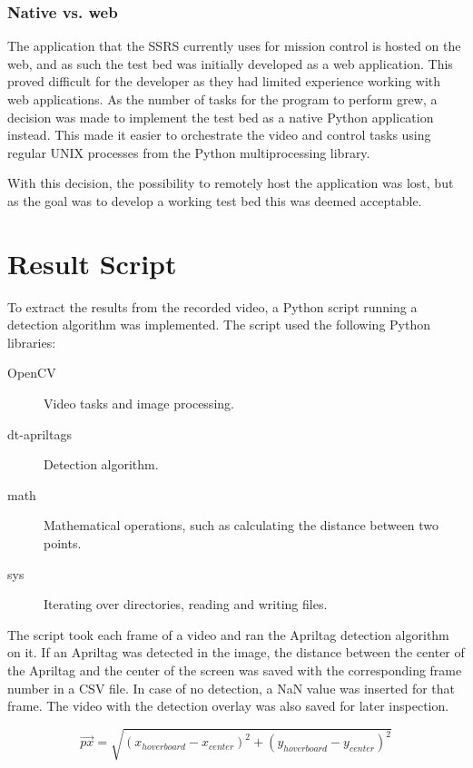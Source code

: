 \documentclass[nofilelist]{cslthse-msc}
\begin{document}
\subsubsection{Native vs. web}
The application that the SSRS currently uses for mission control is hosted on the web, and as such the test bed was initially developed as a web application. This proved difficult for the developer as they had limited experience working with web applications. As the number of tasks for the program to perform grew, a decision was made to implement the test bed as a native Python application instead. This made it easier to orchestrate the video and control tasks using regular UNIX processes from the Python multiprocessing library. 

With this decision, the possibility to remotely host the application was lost, but as the goal was to develop a working test bed this was deemed acceptable. 

\section{Result Script}
\label{sec:resultscript}
To extract the results from the recorded video, a Python script running a detection algorithm was implemented. The script used the following Python libraries:
\begin{description}
   \item[OpenCV] Video tasks and image processing.
   \item[dt-apriltags] Detection algorithm.
   \item[math] Mathematical operations, such as calculating the distance between two points.
   \item[sys] Iterating over directories, reading and writing files.  
\end{description}

The script took each frame of a video and ran the Apriltag detection algorithm on it. If an Apriltag was detected in the image, the distance between the center of the Apriltag and the center of the screen was saved with the corresponding frame number in a CSV file. In case of no detection, a NaN value was inserted for that frame. The video with the detection overlay was also saved for later inspection.

\begin{equation}
   \label{eq:distance}
   \overrightarrow{px} = \sqrt{(x_{hoverboard} - x_{center})^2 + (y_{hoverboard} - y_{center})^2}
\end{equation}
\end{document}

